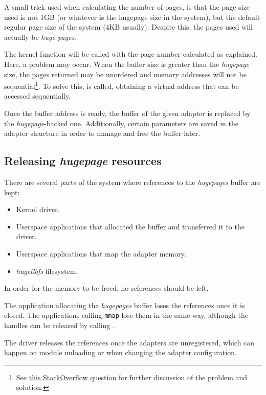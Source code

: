 \documentclass[oneside]{hpman}
\begin{document}
A small trick used when calculating the number of pages, is that the page size used is not 1GB (or whatever is the hugepage size in the system), but the default regular page size of the system (4KB usually). Despite this, the pages used will actually be \textit{huge pages}.

The kernel function  will be called with the page number calculated as explained. Here, a problem may occur. When the buffer size is greater than the \textit{hugepage} size, the pages returned may be unordered and memory addresses will not be sequential\footnote{See \href{http://stackoverflow.com/questions/25000494/sequential-access-to-hugepages-in-kernel-driver}{this StackOverflow} question for further discussion of the problem and solution.}. To solve this,  is called, obtaining a virtual address that can be accessed sequentially.

Once the buffer address is ready, the buffer of the given adapter is replaced by the \textit{hugepage}-backed one. Additionally, certain parameters are saved in the adapter structure in order to manage and free the buffer later.

\subsection{Releasing \textit{hugepage} resources}

There are several parts of the system where references to the \textit{hugepages} buffer are kept:

\begin{itemize}[itemsep = 0pt]
\item Kernel driver.
\item Userspace applications that allocated the buffer and transferred it to the driver.
\item Userspace applications that map the adapter memory.
\item \textit{hugetlbfs} filesystem.
\end{itemize}

In order for the memory to be freed, no references should be left.

The application allocating the \textit{hugepages} buffer loses the references once it is closed. The applications calling \texttt{mmap} lose them in the same way, although the handles can be released by calling .

The driver releases the references once the adapters are unregistered, which can happen on module unloading or when changing the adapter configuration.
\end{document}
